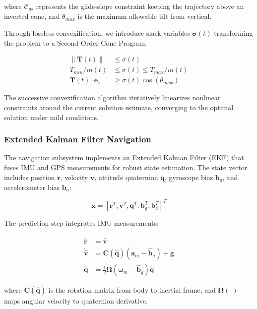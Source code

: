 \documentclass[10pt, conference, compsocconf]{IEEEtran}
\begin{document}
where $\mathcal{C}_{gs}$ represents the glide-slope constraint keeping the trajectory above an inverted cone, and $\theta_{max}$ is the maximum allowable tilt from vertical\cite{blackmore2010minimum}.

Through lossless convexification, we introduce slack variables $\boldsymbol{\sigma}(t)$ transforming the problem to a Second-Order Cone Program:

\begin{align}
\|\mathbf{T}(t)\| &\leq \sigma(t) \\
T_{min}/m(t) &\leq \sigma(t) \leq T_{max}/m(t) \\
\mathbf{T}(t) \cdot \mathbf{e}_z &\geq \sigma(t) \cos(\theta_{max})
\end{align}

The successive convexification algorithm iteratively linearizes nonlinear constraints around the current solution estimate, converging to the optimal solution under mild conditions\cite{acikmese2007convex}.

\subsubsection{Extended Kalman Filter Navigation}
The navigation subsystem implements an Extended Kalman Filter (EKF) that fuses IMU and GPS measurements for robust state estimation\cite{ijertekf}. The state vector includes position $\mathbf{r}$, velocity $\mathbf{v}$, attitude quaternion $\mathbf{q}$, gyroscope bias $\mathbf{b}_g$, and accelerometer bias $\mathbf{b}_a$:

\begin{equation}
\mathbf{x} = [\mathbf{r}^T, \mathbf{v}^T, \mathbf{q}^T, \mathbf{b}_g^T, \mathbf{b}_a^T]^T
\end{equation}

The prediction step integrates IMU measurements:

\begin{align}
\dot{\hat{\mathbf{r}}} &= \hat{\mathbf{v}} \\
\dot{\hat{\mathbf{v}}} &= \mathbf{C}(\hat{\mathbf{q}})(\mathbf{a}_m - \hat{\mathbf{b}}_a) + \mathbf{g} \\
\dot{\hat{\mathbf{q}}} &= \frac{1}{2}\boldsymbol{\Omega}(\boldsymbol{\omega}_m - \hat{\mathbf{b}}_g)\hat{\mathbf{q}}
\end{align}

where $\mathbf{C}(\hat{\mathbf{q}})$ is the rotation matrix from body to inertial frame, and $\boldsymbol{\Omega}(\cdot)$ maps angular velocity to quaternion derivative\cite{ijertekf}.
\end{document}
